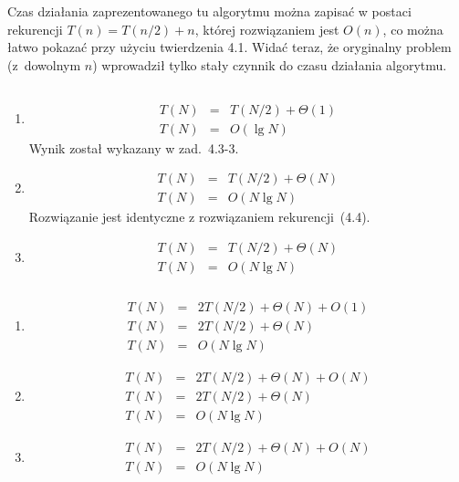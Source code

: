 Czas działania zaprezentowanego tu algorytmu można zapisać w postaci rekurencji $T(n)=T(n/2)+n$, której rozwiązaniem jest $O(n)$, co można łatwo pokazać przy użyciu twierdzenia 4.1. Widać teraz, że oryginalny problem (z~dowolnym $n$) wprowadził tylko stały czynnik do czasu działania algorytmu.

\subsection{} %

\subsubsection{} %
\begin{enumerate}
	\item
	\begin{eqnarray*}
		T(N) &=& T(N/2)+\Theta(1) \\
		T(N) &=& O(\lg N)
	\end{eqnarray*}
	Wynik został wykazany w zad.~4.3-3.
	\item
	\begin{eqnarray*}
		T(N) &=& T(N/2)+\Theta(N) \\
		T(N) &=& O(N\lg N)
	\end{eqnarray*}
	Rozwiązanie jest identyczne z rozwiązaniem rekurencji~(4.4).
	\item
	\begin{eqnarray*}
		T(N) &=& T(N/2)+\Theta(N) \\
		T(N) &=& O(N\lg N)
	\end{eqnarray*}
\end{enumerate}

\subsubsection{} %
\begin{enumerate}
	\item
	\begin{eqnarray*}
		T(N) &=& 2T(N/2)+\Theta(N)+O(1) \\
		T(N) &=& 2T(N/2)+\Theta(N) \\
		T(N) &=& O(N\lg N)
	\end{eqnarray*}
	\item
	\begin{eqnarray*}
		T(N) &=& 2T(N/2)+\Theta(N)+O(N) \\
		T(N) &=& 2T(N/2)+\Theta(N) \\
		T(N) &=& O(N\lg N)
	\end{eqnarray*}
	\item
	\begin{eqnarray*}
		T(N) &=& 2T(N/2)+\Theta(N)+O(N) \\
		T(N) &=& O(N\lg N)
	\end{eqnarray*}
\end{enumerate}

